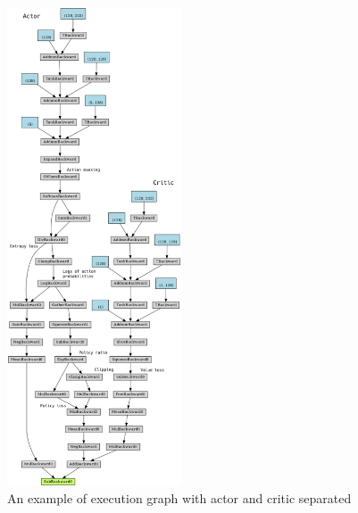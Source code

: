 \documentclass[11pt, a4paper, hidelinks]{report}
\begin{document}
\begin{figure}
\centering
\includegraphics[width=0.46\textwidth]{resources/psppo_separated_graph_commented.png}
\caption{An example of execution graph with actor and critic separated}
\label{fig:psppo_separated_graph_commented}
\end{figure}
\end{document}
